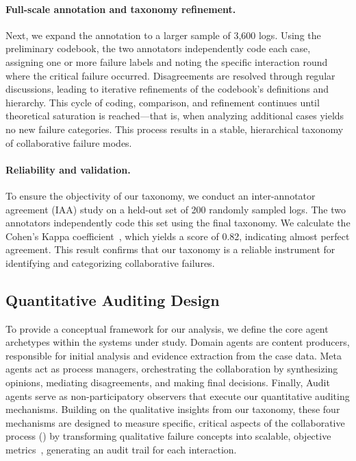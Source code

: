\documentclass{article}
\begin{document}
\paragraph{Full-scale annotation and taxonomy refinement.}
Next, we expand the annotation to a larger sample of 3,600 logs. Using the preliminary codebook, the two annotators independently code each case, assigning one or more failure labels and noting the specific interaction round where the critical failure occurred. Disagreements are resolved through regular discussions, leading to iterative refinements of the codebook's definitions and hierarchy. This cycle of coding, comparison, and refinement continues until theoretical saturation is reached---that is, when analyzing additional cases yields no new failure categories. This process results in a stable, hierarchical taxonomy of collaborative failure modes.

\paragraph{Reliability and validation.}
To ensure the objectivity of our taxonomy, we conduct an inter-annotator agreement (IAA) study on a held-out set of 200 randomly sampled logs. The two annotators independently code this set using the final taxonomy. We calculate the Cohen's Kappa coefficient~\cite{cohen1960coefficient}, which yields a score of 0.82, indicating almost perfect agreement. This result confirms that our taxonomy is a reliable instrument for identifying and categorizing collaborative failures.

\subsection{Quantitative Auditing Design}
To provide a conceptual framework for our analysis, we define the core agent archetypes within the systems under study. Domain agents are content producers, responsible for initial analysis and evidence extraction from the case data. Meta agents act as process managers, orchestrating the collaboration by synthesizing opinions, mediating disagreements, and making final decisions. Finally, Audit agents serve as non-participatory observers that execute our quantitative auditing mechanisms. Building on the qualitative insights from our taxonomy, these four mechanisms are designed to measure specific, critical aspects of the collaborative process () by transforming qualitative failure concepts into scalable, objective metrics~\cite{lundberg2017unified,zheng2023llm_as_a_judge}, generating an audit trail for each interaction.
\end{document}
